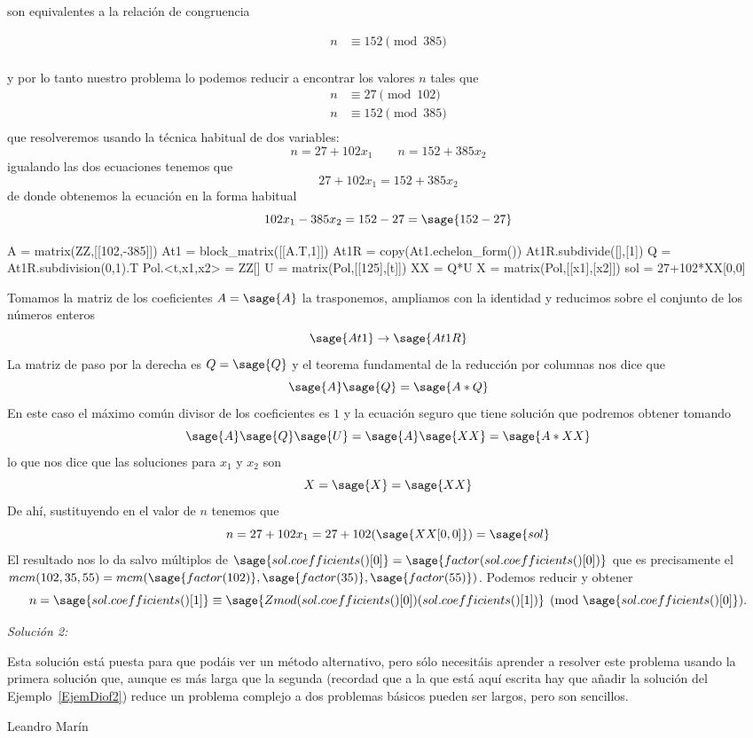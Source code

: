 \documentclass{amsart}
\begin{document}
son equivalentes a la relación de congruencia 

\begin{align*}
n &\equiv 152 \pmod{385} \\
\end{align*}

y por lo tanto nuestro problema lo podemos reducir a encontrar los valores $n$ tales
que 
\begin{align*}
n &\equiv 27 \pmod{102} \\
n &\equiv 152 \pmod{385} \\
\end{align*}
que resolveremos usando la técnica habitual de dos variables:
$$ n = 27+102x_1 \qquad n = 152+385x_2 $$
igualando las dos ecuaciones tenemos que $$27+102x_1 = 152+385x_2 $$
de donde obtenemos la ecuación en la forma habitual $$ 102x_1 - 385 x_2 = 152-27 = \sage{152-27}$$

\begin{sageblock}
A = matrix(ZZ,[[102,-385]])
At1 = block_matrix([[A.T,1]])
At1R = copy(At1.echelon_form())
At1R.subdivide([],[1])
Q = At1R.subdivision(0,1).T
Pol.<t,x1,x2> = ZZ[]
U = matrix(Pol,[[125],[t]])
XX = Q*U
X = matrix(Pol,[[x1],[x2]])
sol = 27+102*XX[0,0]
\end{sageblock}

Tomamos la matriz de los coeficientes $A = \sage{A}$ la trasponemos, ampliamos con la 
identidad y reducimos sobre el conjunto de los números enteros
$$ \sage{At1} \to \sage{At1R}$$
La matriz de paso por la derecha es $Q = \sage{Q}$ y el teorema fundamental de la reducción
por columnas nos dice que 
$$ \sage{A} \sage{Q} = \sage{A*Q}$$
En este caso el máximo común divisor de los coeficientes es $1$ y la ecuación seguro que tiene
solución que podremos obtener tomando 
$$ \sage{A} \sage{Q} \sage{U} = \sage{A} \sage{XX} = \sage{A*XX}$$
lo que nos dice que las soluciones para $x_1$ y $x_2$ son 
$$ X = \sage{X} = \sage{XX}$$
De ahí, sustituyendo en el valor de $n$ tenemos que 
$$ n = 27+102x_1 = 27+102(\sage{XX[0,0]}) = \sage{sol}$$
El resultado nos lo da salvo múltiplos de 
$\sage{sol.coefficients()[0]} = \sage{factor(sol.coefficients()[0])}$ 
que es precisamente el $mcm(102,35,55) = 
mcm(\sage{factor(102)},\sage{factor(35)},\sage{factor(55)})$. Podemos reducir y obtener 
$$ n = \sage{sol.coefficients()[1]} \equiv 
\sage{Zmod(sol.coefficients()[0])(sol.coefficients()[1])} 
\pmod{\sage{sol.coefficients()[0]}}.$$

{\it Solución 2: }

\begin{tcolorbox}[title = Nota del Coordinador]
Esta solución está puesta para que podáis ver un método alternativo, pero
sólo necesitáis aprender a resolver este problema usando la primera solución que,
aunque es más larga que la segunda (recordad que a la que está aquí escrita hay 
que añadir la solución del Ejemplo~\ref{EjemDiof2}) reduce un problema complejo
a dos problemas básicos pueden ser largos, pero son sencillos. 

\flushright Leandro Marín
\end{tcolorbox} 
\end{document}
